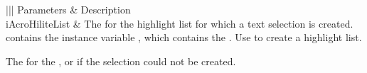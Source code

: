 \documentclass[letterpaper,12pt,english,openany,oneside]{sphinxmanual}
\begin{document}

\begin{sphinxVerbatim}[commandchars=\\\{\}]
  
\end{sphinxVerbatim}
\label{\detokenize{IAC_API_OLE_Objects:parameters-71}}


\begin{savenotes}\sphinxattablestart
\centering
{}\label{\detokenize{IAC_API_OLE_Objects:section-80}}\nobreak
\begin{tabular}[t]{|||}
\hline
\sphinxstyletheadfamily 
Parameters
&\sphinxstyletheadfamily 
Description
\\
\hline
iAcroHiliteList
&
The  for the highlight list for which a text selection is created.  contains the instance variable , which contains the .   Use   to create a highlight list.
\\
\hline
\end{tabular}
\par
\sphinxattableend\end{savenotes}


The  for the , or  if the selection could not be created.
\end{document}
